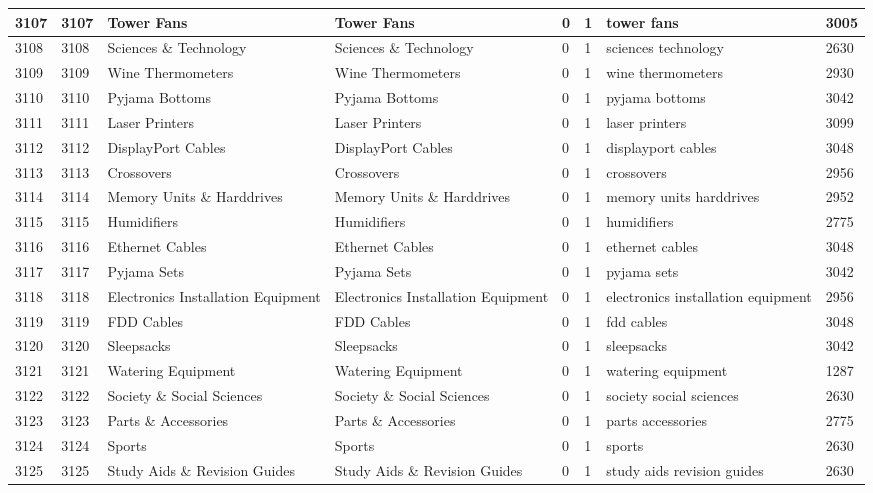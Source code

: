 \begin{longtable}{|l|l|l|l|l|l|l|l|}
3107 & 3107 & Tower Fans & Tower Fans & 0 & 1 & tower fans & 3005 \\ \hline 
3108 & 3108 & Sciences \& Technology & Sciences \& Technology & 0 & 1 & sciences technology & 2630 \\ \hline 
3109 & 3109 & Wine Thermometers & Wine Thermometers & 0 & 1 & wine thermometers & 2930 \\ \hline 
3110 & 3110 & Pyjama Bottoms & Pyjama Bottoms & 0 & 1 & pyjama bottoms & 3042 \\ \hline 
3111 & 3111 & Laser Printers & Laser Printers & 0 & 1 & laser printers & 3099 \\ \hline 
3112 & 3112 & DisplayPort Cables & DisplayPort Cables & 0 & 1 & displayport cables & 3048 \\ \hline 
3113 & 3113 & Crossovers & Crossovers & 0 & 1 & crossovers & 2956 \\ \hline 
3114 & 3114 & Memory Units \& Harddrives & Memory Units \& Harddrives & 0 & 1 & memory units harddrives & 2952 \\ \hline 
3115 & 3115 & Humidifiers & Humidifiers & 0 & 1 & humidifiers & 2775 \\ \hline 
3116 & 3116 & Ethernet Cables & Ethernet Cables & 0 & 1 & ethernet cables & 3048 \\ \hline 
3117 & 3117 & Pyjama Sets & Pyjama Sets & 0 & 1 & pyjama sets & 3042 \\ \hline 
3118 & 3118 & Electronics Installation Equipment & Electronics Installation Equipment & 0 & 1 & electronics installation equipment & 2956 \\ \hline 
3119 & 3119 & FDD Cables & FDD Cables & 0 & 1 & fdd cables & 3048 \\ \hline 
3120 & 3120 & Sleepsacks & Sleepsacks & 0 & 1 & sleepsacks & 3042 \\ \hline 
3121 & 3121 & Watering Equipment & Watering Equipment & 0 & 1 & watering equipment & 1287 \\ \hline 
3122 & 3122 & Society \& Social Sciences & Society \& Social Sciences & 0 & 1 & society social sciences & 2630 \\ \hline 
3123 & 3123 & Parts \& Accessories & Parts \& Accessories & 0 & 1 & parts accessories & 2775 \\ \hline 
3124 & 3124 & Sports & Sports & 0 & 1 & sports & 2630 \\ \hline 
3125 & 3125 & Study Aids \& Revision Guides & Study Aids \& Revision Guides & 0 & 1 & study aids revision guides & 2630 \\ \hline 

\end{longtable}
